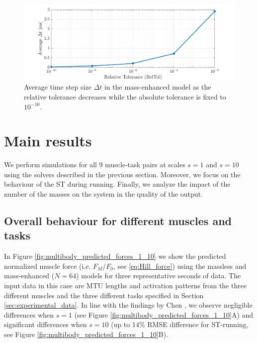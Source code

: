 \documentclass{sfuthesis}
\numberwithin{equation}{chapter}
\numberwithin{figure}{chapter}
\numberwithin{table}{chapter}
\theoremstyle{definition}
\begin{document}
\begin{figure}
    \centering
    \includegraphics[width=\textwidth]{convergence_dt.png}
    \caption{Average time step size $\Delta t$ in the mass-enhanced model as the relative tolerance decreases while the absolute tolerance is fixed to $10^{-10}$.}
    \label{fig:multibody-reltol-avg-deltat}
\end{figure}


\section{Main results}

We perform simulations for all 9 muscle-task pairs at scales $s=1$ and $s=10$ using the solvers described in the previous section. Moreover, we focus on the behaviour of the ST during running. Finally, we analyze the impact of the number of the masses on the system in the quality of the output.

\subsection{Overall behaviour for different muscles and tasks}

In Figure \ref{fig:multibody_predicted_forces_1_10} we show the predicted normalized muscle force (i.e. $F_M/F_0$, see \eqref{eq:Hill_force}) using the massless and mass-enhanced ($N = 64$) models for three representative seconds of data. The input data in this case are MTU lengths and activation patterns from the three different muscles and the three different tasks specified in Section \ref{sec:experimental_data}. In line with the findings by Chen \cite{EvanThesis}, we observe negligible differences when $s=1$ (see Figure \ref{fig:multibody_predicted_forces_1_10}A) and significant differences when $s=10$ (up to 14\% RMSE difference for ST-running, see Figure \ref{fig:multibody_predicted_forces_1_10}B).
\end{document}
